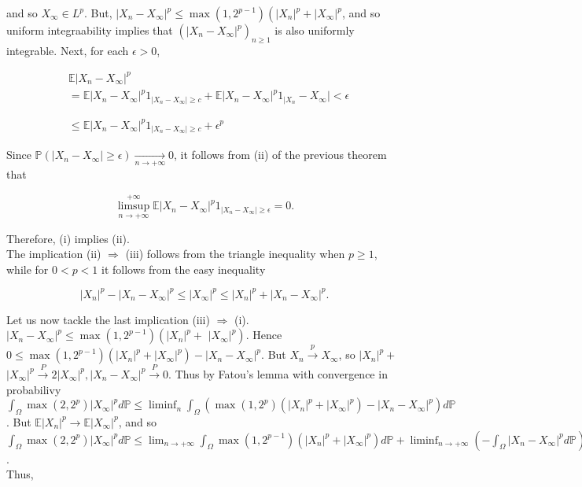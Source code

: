 \documentclass[11pt]{amsbook}
\theoremstyle{plain}%
\theoremstyle{definition}
\theoremstyle{remark}
\begin{document}
and so $X_{\infty} \in L^{p}$. But, $\left|X_{n}-X_{\infty}\right|^{p} \leq \max \left(1,2^{p-1}\right)\left(\left|X_{n}\right|^{p}+\left|X_{\infty}\right|^{p}\right.$, and so uniform integraability implies that $\left(\left|X_{n}-X_{\infty}\right|^{p}\right)_{n \geq 1}$ is also uniformly integrable. Next, for each $\epsilon>0$,

$$
\begin{aligned}
& \mathbb{E}\left|X_{n}-X_{\infty}\right|^{p} \\
& =\mathbb{E}\left|X_{n}-X_{\infty}\right|^{p} 1_{\left|X_{n}-X_{\infty}\right| \geq c}+\mathbb{E}\left|X_{n}-X_{\infty}\right|^{p} 1_{\mid X_{n}}-X_{\infty} \mid<\epsilon \\
& \\
& \\
& \leq \mathbb{E}\left|X_{n}-X_{\infty}\right|^{p} 1_{\left|X_{n}-X_{\infty}\right| \geq c}+\epsilon^{p}
\end{aligned}
$$

Since $\mathbb{P}\left(\left|X_{n}-X_{\infty}\right| \geq \epsilon\right) \underset{n \rightarrow+\infty}{\longrightarrow} 0$, it follows from (ii) of the previous theorem that

$$
\limsup _{n \rightarrow+\infty}^{+\infty} \mathbb{E}\left|X_{n}-X_{\infty}\right|^{p} 1_{\left|X_{n}-X_{\infty}\right| \geq \epsilon}=0 .
$$

Therefore, (i) implies (ii).\\
The implication (ii) $\Rightarrow$ (iii) follows from the triangle inequality when $p \geq 1$, while for $0<p<1$ it follows from the easy inequality

$$
\left|X_{n}\right|^{p}-\left|X_{n}-X_{\infty}\right|^{p} \leq\left|X_{\infty}\right|^{p} \leq\left|X_{n}\right|^{p}+\left|X_{n}-X_{\infty}\right|^{p} .
$$

Let us now tackle the last implication (iii) $\Rightarrow$ (i). $\left|X_{n}-X_{\infty}\right|^{p} \leq \max \left(1,2^{p-1}\right)\left(\left|X_{n}\right|^{p}+\right.$ $\left.\left|X_{\infty}\right|^{p}\right)$. Hence $0 \leq \max \left(1,2^{p-1}\right)\left(\left|X_{n}\right|^{p}+\left|X_{\infty}\right|^{p}\right)-\left|X_{n}-X_{\infty}\right|^{p}$. But $X_{n} \xrightarrow{p} X_{\infty}$, so $\left|X_{n}\right|^{p}+$ $\left|X_{\infty}\right|^{p} \xrightarrow{P} 2\left|X_{\infty}\right|^{p},\left|X_{n}-X_{\infty}\right|^{p} \xrightarrow{P} 0$. Thus by Fatou's lemma with convergence in probabilivy $\int_{\Omega} \max \left(2,2^{p}\right)\left|X_{\infty}\right|^{p} d \mathbb{P} \leq \liminf _{n} \int_{\Omega}\left(\max \left(1,2^{p}\right)\left(\left|X_{n}\right|^{p}+\left|X_{\infty}\right|^{p}\right)-\left|X_{n}-X_{\infty}\right|^{p}\right) d \mathbb{P}$. But $\mathbb{E}\left|X_{n}\right|^{p} \rightarrow \mathbb{E}\left|X_{\infty}\right|^{p}$, and so\\
$\int_{\Omega} \max \left(2,2^{p}\right)\left|X_{\infty}\right|^{p} d \mathbb{P} \leq \lim _{n \rightarrow+\infty} \int_{\Omega} \max \left(1,2^{p-1}\right)\left(\left|X_{n}\right|^{p}+\left|X_{\infty}\right|^{p}\right) d \mathbb{P}+\liminf _{n \rightarrow+\infty}\left(-\int_{\Omega}\left|X_{n}-X_{\infty}\right|^{p} d \mathbb{P}\right)$.\\
Thus,
\end{document}
